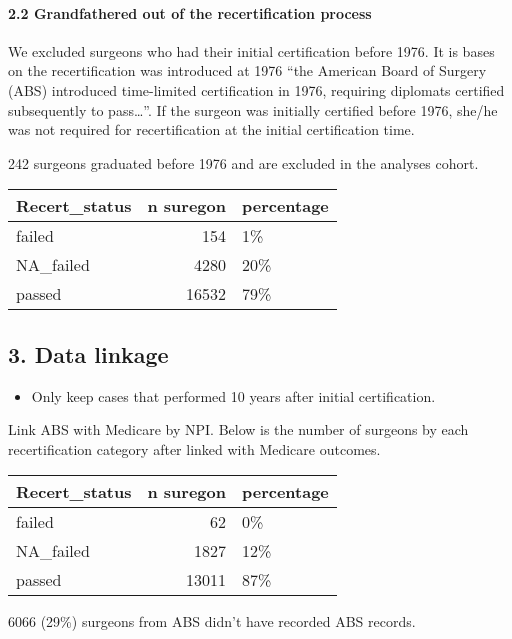 \documentclass[
]{article}
\providecommand{\tightlist}{%
  \setlength{\itemsep}{0pt}\setlength{\parskip}{0pt}}
\begin{document}
\hypertarget{grandfathered-out-of-the-recertification-process}{%
\paragraph{2.2 Grandfathered out of the recertification
process}\label{grandfathered-out-of-the-recertification-process}}

We excluded surgeons who had their initial certification before 1976. It
is bases on the recertification was introduced at 1976 ``the American
Board of Surgery (ABS) introduced time-limited certification in 1976,
requiring diplomats certified subsequently to pass\ldots{}''. If the
surgeon was initially certified before 1976, she/he was not required for
recertification at the initial certification time.

242 surgeons graduated before 1976 and are excluded in the analyses
cohort.

\begin{table}[H]
\centering
\begin{tabular}{l|r|l}
\hline
Recert\_status & n suregon & percentage\\
\hline
failed & 154 & 1\%\\
\hline
NA\_failed & 4280 & 20\%\\
\hline
passed & 16532 & 79\%\\
\hline
\end{tabular}
\end{table}

\hypertarget{data-linkage}{%
\subsection{3. Data linkage}\label{data-linkage}}

\begin{itemize}
\tightlist
\item
  Only keep cases that performed 10 years after initial certification.
\end{itemize}

Link ABS with Medicare by NPI. Below is the number of surgeons by each
recertification category after linked with Medicare outcomes.

\begin{table}[H]
\centering
\begin{tabular}{l|r|l}
\hline
Recert\_status & n suregon & percentage\\
\hline
failed & 62 & 0\%\\
\hline
NA\_failed & 1827 & 12\%\\
\hline
passed & 13011 & 87\%\\
\hline
\end{tabular}
\end{table}

6066 (29\%) surgeons from ABS didn't have recorded ABS records.
\end{document}
